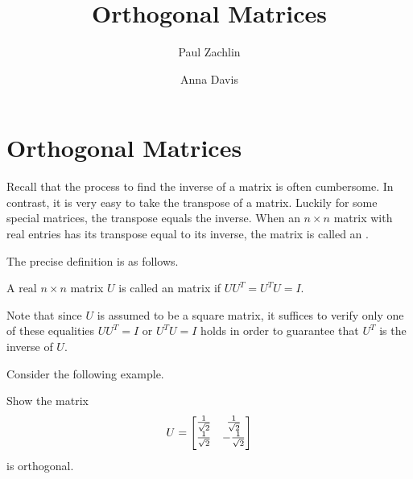 \documentclass{ximera}
\author{Paul Zachlin \and Anna Davis} \title{Orthogonal Matrices} \license{CC-BY 4.0}
\begin{document}
\begin{abstract}

\end{abstract}
\maketitle

\section*{Orthogonal Matrices}
Recall that the process to find the inverse of a matrix is often cumbersome.
In contrast, it is very easy to take the transpose of a matrix. Luckily for some special matrices, the transpose equals the inverse. When an $n \times n$ matrix with real
entries has its transpose equal to its inverse, the matrix is called an .

The precise definition is as follows.

\begin{definition}\label{OrthoMatrix}
A real $n\times n$ matrix $U$ is called an  matrix if $UU^{T}=U^{T}U=I.$
\end{definition}

Note that since $U$ is assumed to be a square matrix, it suffices to verify only one of these equalities $UU^{T}=I$ or $U^{T}U=I$ holds in order to guarantee that $U^T$ is the inverse of $U$.

Consider the following example.

\begin{example}\label{ex:OrthogonalMatrix1}
Show the matrix
\begin{equation*}
U=\begin{bmatrix}
\frac{1}{\sqrt{2}} & \frac{1}{\sqrt{2}} \\
\vspace{0.05in}\frac{1}{\sqrt{2}} & -\frac{1}{\sqrt{2}}
\end{bmatrix}
\end{equation*}
is orthogonal.
\end{example}
\end{document}
